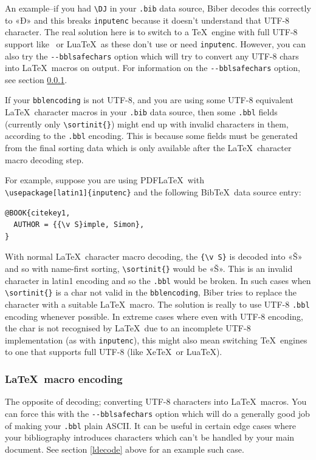 \documentclass{ltxdockit}
\begin{document}
An example--if you had \verb+\DJ+ in your \verb+.bib+ data source,
Biber decodes this correctly to «Đ» and this breaks \verb+inputenc+
because it doesn't understand that UTF-8 character. The real solution here
is to switch to a \TeX\ engine with full UTF-8 support like \XeTeX\ or Lua\TeX\
as these don't use or need \verb+inputenc+. However, you can also try the
\verb+--bblsafechars+ option which will try to convert any UTF-8 chars into
\LaTeX\ macros on output. For information on the \verb+--bblsafechars+
option, see section \ref{lencode}.
\bigskip
{}

If your \verb+bblencoding+ is not UTF-8, and you are using some UTF-8
equivalent \LaTeX\ character macros in your \verb+.bib+ data source, then some
\verb+.bbl+ fields (currently only \verb+\sortinit{}+) might end up
with invalid characters in them, according to the \verb+.bbl+
encoding. This is because some fields must be generated from the final
sorting data which is only available after the \LaTeX\ character macro
decoding step.

For example, suppose you are using PDF\LaTeX\ with\\
\verb+\usepackage[latin1]{inputenc}+ and the following Bib\TeX\
data source entry:

\begin{verbatim}
@BOOK{citekey1,
  AUTHOR = {{\v S}imple, Simon},
}
\end{verbatim}

\noindent With normal \LaTeX\ character macro decoding, the
\verb+{\v S}+ is decoded into «Š» and so with name-first sorting,
\verb+\sortinit{}+ would be «Š». This is an invalid character in
latin1 encoding and so the \verb+.bbl+ would be broken. In such cases
when \verb+\sortinit{}+ is a char not valid in the \verb+bblencoding+,
Biber tries to replace the character with a suitable \LaTeX\
macro. The solution is really to use UTF-8 \verb+.bbl+ encoding whenever
possible. In extreme cases where even with UTF-8 encoding,
the char is not recognised by \LaTeX\ due to an incomplete UTF-8
implementation (as with \verb+inputenc+), this might also mean
switching \TeX\ engines to one that supports full UTF-8 (like Xe\TeX\ or Lua\TeX).

\subsubsection{\LaTeX\ macro encoding}\label{lencode}

The opposite of decoding; converting UTF-8 characters into \LaTeX\ macros.
You can force this with the \verb+--bblsafechars+ option which will do a
generally good job of making your \verb+.bbl+ plain ASCII. It can be useful
in certain edge cases where your bibliography introduces characters which
can't be handled by your main document. See section \ref{ldecode} above for
an example such case.
\end{document}
